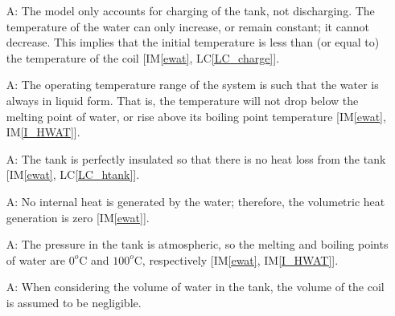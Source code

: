 \documentclass[12pt]{article}
\newcounter{assumpnum} %
\newcommand{\aref}[1]{A\ref{#1}}
\newcommand{\iref}[1]{IM\ref{#1}}
\newcommand{\lcref}[1]{LC\ref{#1}}
\begin{document}
\begin{itemize}
\item[A\refstepcounter{assumpnum}\theassumpnum \label{A_charge}:] The model only
  accounts for charging of the tank, not discharging.  The temperature of the
  water 
  can only increase, or remain constant; it cannot decrease.
  This implies that the initial temperature %
  is less than (or
  equal to) the temperature of the coil [\iref{ewat}, \lcref{LC_charge}].



\item[A\refstepcounter{assumpnum}\theassumpnum \label{A_OpRange}:] The operating
  temperature range of the system is such that the water is always in liquid
  form.  That is, the temperature will not drop below the melting point of water, or rise
  above its boiling point temperature [\iref{ewat}, \iref{I_HWAT}].

\item[A\refstepcounter{assumpnum}\theassumpnum \label{A_htank}:] The tank is
  perfectly insulated so that there is no heat loss from the tank [\iref{ewat},
  \lcref{LC_htank}].

\item[A\refstepcounter{assumpnum}\theassumpnum \label{A_int_heat}:] No internal
  heat is generated by the water;
  therefore, the volumetric
  heat generation is zero [\iref{ewat}].%
	


\item[A\refstepcounter{assumpnum}\theassumpnum \label{A_tk_prssr}:] The pressure
  in the tank is atmospheric, so the melting and boiling points of water are
  $0^o\text{C}$ and $100^o\text{C}$, respectively [\iref{ewat}, \iref{I_HWAT}].

\item[A\refstepcounter{assumpnum}\theassumpnum \label{A_VolCoil}:] When
  considering the volume of water in the tank, the volume of the coil is assumed
  to be negligible.
	
\end{itemize}
\end{document}
